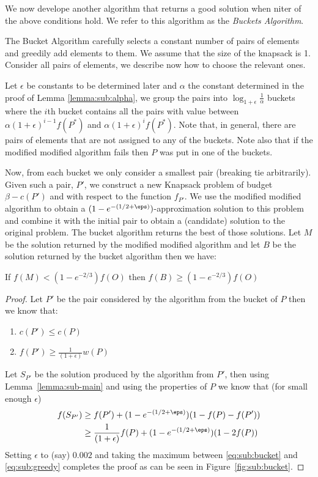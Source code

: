 We now develope another algorithm that returns a good solution when niter of the above conditions hold.
We refer to this algorithm as the \emph{Buckets Algorithm}.

The Bucket Algorithm carefully selects a constant number of pairs of elements and greedily add elements to them.
We assume that the size of the knapsack is 1.
Consider all pairs of elements, we describe now how to choose the relevant ones.

Let $\epsilon$ be constants to be determined later and $\alpha$ the constant determined in the proof of Lemma \ref{lemma:sub:alpha},
we group the pairs into $\log_{1 + \epsilon}\frac{1}{\alpha}$ buckets where the $i$th bucket contains all the pairs with value
between $\alpha (1 + \epsilon)^{i - 1}f(P^*)$ and $\alpha (1 + \epsilon)^{i}f(P^*)$.
Note that, in general, there are pairs of elements that are not assigned to any of the buckets.
Note also that if the modified modified algorithm fails then $P$ was put in one of the buckets.

Now, from each bucket we only consider a smallest pair (breaking tie arbitrarily).
Given such a pair, $P'$, we construct a new Knapsack problem of budget $\beta - c(P')$ and with respect to the function $f_{P'}$.
We use the modified modified algorithm to obtain a $(1-e^{-(1/2 + \eps)})$-approximation
solution to this problem and combine it with the initial pair to obtain a (candidate)
solution to the original problem.
The bucket algorithm returns the best of those solutions.
Let $M$ be the solution returned by the modified modified algorithm and let $B$ be the solution returned by the bucket algorithm then we have:

\begin{lemma}
	If $f(M) < (1 - e^{-2/3})f(O)$ then $f(B) \geq (1 - e^{-2/3})f(O)$
\end{lemma}

\begin{proof}
	Let $P'$ be the pair considered by the algorithm from the bucket of $P$ then we know that:
	\begin{enumerate}
		\item $c(P') \leq c(P)$
		\item $f(P') \geq \frac{1}{(1 + \epsilon)}w(P)$
	\end{enumerate}
	Let $S_{P'}$ be the solution produced by the algorithm from $P'$,
	then using Lemma~\ref{lemma:sub-main} and using the properties of $P$ we know that (for small enough $\epsilon$)
	\begin{align}
		f(S_{P'}) & \geq f(P') + (1-e^{-(1/2 + \eps)})(1 - f(P) - f(P'))
		\\ & 
		\geq \frac{1}{(1 + \epsilon)}f(P) + (1-e^{-(1/2 + \eps)})(1 - 2f(P))
		\label{eq:sub:bucket}
	\end{align}
	Setting $\epsilon$ to (say) $0.002$ and taking the maximum between \ref{eq:sub:bucket} and
	\ref{eq:sub:greedy} completes the proof as can be seen in Figure~\ref{fig:sub:bucket}.
\end{proof}

